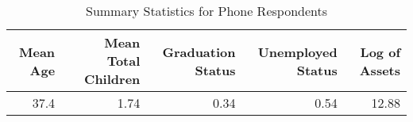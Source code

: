 \begin{table}

\caption{Summary Statistics for Phone Respondents \label{tab:phone_reply_char}}
\centering
\begin{tabular}[t]{rrrrr}
\toprule
Mean Age & Mean Total Children & Graduation Status & Unemployed Status & Log of Assets\\
\midrule
37.4 & 1.74 & 0.34 & 0.54 & 12.88\\
\bottomrule
\end{tabular}
\end{table}
